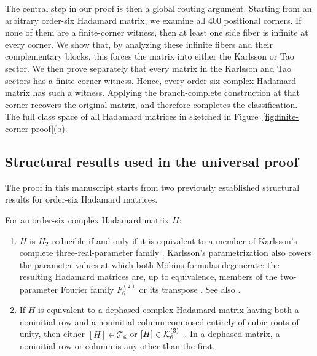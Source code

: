 The central step in our proof is then a global routing argument. Starting from an arbitrary order-six Hadamard matrix, we examine all $400$ positional corners. 
If none of them are a finite-corner witness, then at least one side fiber is infinite at every corner. We show that, by analyzing these infinite fibers and their complementary blocks, this forces the matrix into either the Karlsson or Tao sector. We then prove separately that every matrix in the Karlsson and Tao sectors has a finite-corner witness. 
Hence, every order-six complex Hadamard matrix has such a witness. Applying the branch-complete construction at that corner recovers the original matrix, and therefore completes the classification.
The full class space of all Hadamard matrices in sketched in Figure~\ref{fig:finite-corner-proof}(b).

\subsection{Structural results used in the universal proof}
The proof in this manuscript starts from two previously established structural results for order-six Hadamard matrices. 

\begin{proposition}
\label{prop:publishedinputs}
For an order-six complex Hadamard matrix $H$:
\begin{enumerate}
\item $H$ is $H_2$-reducible if and only if it is equivalent to a
member of Karlsson's complete three-real-parameter family
\cite{Karlsson2011H2,Karlsson2011ThreeParameter}. Karlsson's
parametrization also covers the parameter values at which both
M\"obius formulas degenerate: the resulting Hadamard matrices are,
up to equivalence, members of the two-parameter Fourier family
$F_6^{(2)}$ or its transpose
\cite[Secs.~4--5 and Theorem~11]{Karlsson2011ThreeParameter}.
See also
\cite[p.~623, Theorem~2.11]{Szollosi2012FourParameter}.
\item If $H$ is equivalent to a dephased complex Hadamard matrix having both a noninitial row and a noninitial column composed entirely of cubic roots of unity, then either $[H] \in \mathcal T_6$ or
$[H]\in\mathcal K_6^{(3)}$~\cite[p.~624, Lemma~2.14]{Szollosi2012FourParameter}. 
In a dephased matrix, a noninitial row or
column is any other than the first.
\end{enumerate}
\end{proposition}

